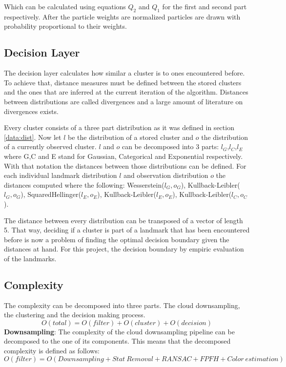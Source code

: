 \documentclass[]{article}
\begin{document}
    Which can be calculated using equations $Q_2$ and $Q_1$ for the first and second part respectively. After the particle weights are normalized particles are drawn with probability proportional to their weights.

    \subsection{Decision Layer}

    The decision layer calculates how similar a cluster is to ones encountered before. To achieve that, distance measures must be defined between the stored clusters and the ones that are inferred at the current iteration of the algorithm. Distances between distributions are called divergences and a large amount of literature on divergences exists.

    Every cluster consists of a three part distribution as it was defined in section \ref{data:dist}. Now let $l$ be the distribution of a stored cluster and $o$ the distribution of a currently observed cluster. $l$ and $o$ can be decomposed into 3 parts: $l_G$,$l_C$,$l_E$ where G,C and E stand for Gaussian, Categorical and Exponential respectively. With that notation the distances between those distributions can be defined. For each individual landmark distribution $l$ and observation distribution $o$ the distances computed where the following: Wesserstein($l_G,o_G$), Kullback-Leibler($l_G,o_G$), SquaredHellinger($l_E,o_E$), Kullback-Leibler($l_E,o_E$), Kullback-Leibler($l_C,o_C$).

    The distance between every distribution can be transposed of a vector of length 5. That way, deciding if a cluster is part of a landmark that has been encountered before is now a problem of finding the optimal decision boundary given the distances at hand. For this project, the decision boundary by empiric evaluation of the landmarks.



  \subsection{Complexity}

    The complexity can be decomposed into three parts. The cloud downsampling, the clustering and the decision making process.
    $$
    O(total) = O(filter) + O(cluster) + O(decision)
    $$
    \textbf{Downsampling}: The complexity of the cloud downsampling pipeline can be decomposed to the one of its components. This means that the decomposed complexity is defined as follows:
    $$O(filter) = O(Downsampling + Stat\ Removal + RANSAC+ FPFH + Color\ estimation) $$
\end{document}
